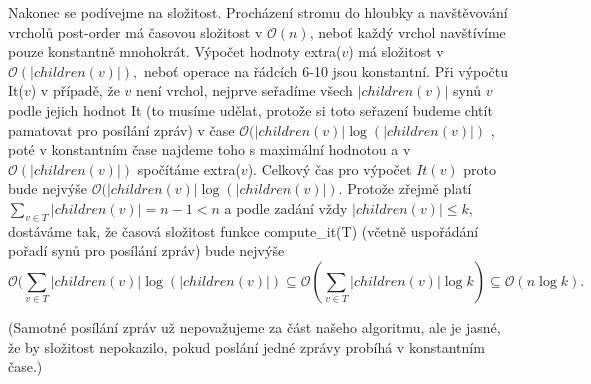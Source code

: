 \documentclass[12pt,a4paper]{article}
\theoremstyle{plain}
\begin{document}
Nakonec se podívejme na složitost. Procházení stromu do hloubky a navštěvování vrcholů post-order má časovou složitost v $\mathcal{O}(n)$, neboť každý vrchol navštívíme pouze konstantně mnohokrát.
 Výpočet hodnoty extra($v$) má složitost v $\mathcal{O}(|children(v)|),$ neboť operace na řádcích 6-10 jsou konstantní. Při výpočtu It($v$) v případě, že $v$ není vrchol, nejprve seřadíme všech $|children(v)|$ synů $v$ podle jejich hodnot It (to musíme udělat, protože si toto seřazení budeme chtít pamatovat pro posílání zpráv) v čase $\mathcal{O}(|children(v)|\log (|children(v)|)$ , poté v konstantním čase najdeme toho s maximální hodnotou a v $\mathcal{O}(|children(v)|)$ spočítáme extra($v$). Celkový čas pro výpočet $It(v)$ proto bude nejvýše $\mathcal{O}(|children(v)|\log (|children(v)|)$. Protože zřejmě platí $\sum_{v\in T}|children(v)|=n-1<n$ a podle zadání vždy $|children(v)|\leq k$, dostáváme tak, že časová složitost funkce compute\_it(T) (včetně uspořádání pořadí synů pro posílání zpráv) bude nejvýše
$$\mathcal{O}(\sum_{v\in T}|children(v)|\log (|children(v)|)\subseteq \mathcal{O}(\sum_{v\in T}|children(v)|\log k)\subseteq \mathcal{O}(n\log k).$$

(Samotné posílání zpráv už nepovažujeme za část našeho algoritmu, ale je jasné, že by složitost nepokazilo, pokud poslání jedné zprávy probíhá v konstantním čase.)

\end{document}
